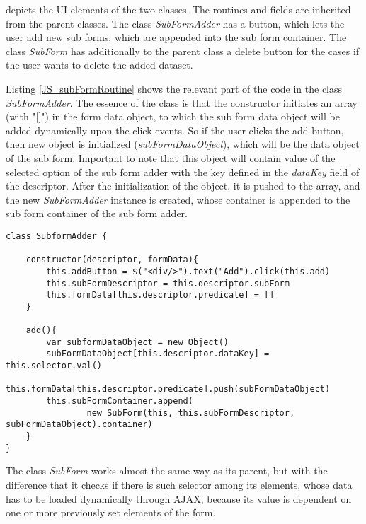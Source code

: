 

 depicts the UI elements of the two classes. The routines and fields are inherited from the parent classes. The class \textit{SubFormAdder} has a button, which lets the user add new sub forms, which are appended into the sub form container. The class \textit{SubForm} has additionally to the parent class a delete button for the cases if the user wants to delete the added dataset.  

Listing \ref{JS_subFormRoutine} shows the relevant part of the code in the class \textit{SubFormAdder}. The essence of the class is that the constructor initiates an array (with "[]") in the form data object, to which the sub form data object will be added dynamically upon the click events. So if the user clicks the add button, then new object is initialized (\textit{subFormDataObject}), which will be the data object of the sub form. Important to note that this object will contain value of the selected option of the sub form adder with the key defined in the \textit{dataKey} field of the descriptor. After the initialization of the object, it is pushed to the array, and the new \textit{SubFormAdder} instance is created, whose container is appended to the sub form container of the sub form adder. 


\begin{lstlisting}[basicstyle=\footnotesize, frame=single, caption={Sub form adder routine}, label=JS_subFormRoutine, captionpos=b, belowskip=1em, aboveskip=2em]
class SubformAdder {
	
	constructor(descriptor, formData){
		this.addButton = $("<div/>").text("Add").click(this.add)    
		this.subFormDescriptor = this.descriptor.subForm
		this.formData[this.descriptor.predicate] = []
	}

	add(){
		var subformDataObject = new Object()
		subFormDataObject[this.descriptor.dataKey] = this.selector.val()
		this.formData[this.descriptor.predicate].push(subFormDataObject) 
		this.subFormContainer.append(
				new SubForm(this, this.subFormDescriptor, subFormDataObject).container)
	}
}
\end{lstlisting}


The class \textit{SubForm} works almost the same way as its parent, but with the difference that it checks if there is such selector among its elements, whose data has to be loaded dynamically through AJAX, because its value is dependent on one or more previously set elements of the form.  

